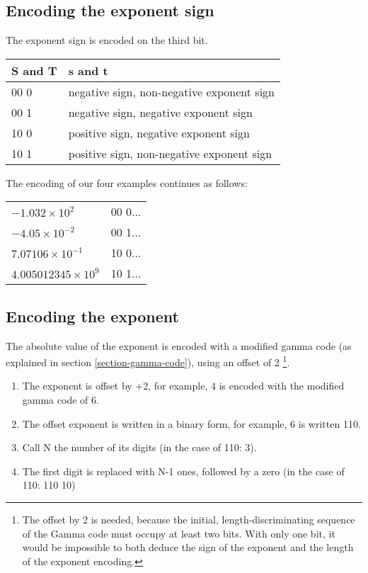 \documentclass[final,leqno,onefignum,onetabnum]{siamltex1213}
\begin{document}
\subsection{Encoding the exponent sign}

The exponent sign is encoded on the third bit.

\begin{tabular}{|l|l|}
\hline
S and T & s and t \\
\hline
00 0 &  negative sign, non-negative exponent sign\\
\hline
00 1 & negative sign, negative exponent sign\\
\hline
10 0 & positive sign, negative exponent sign\\
\hline
10 1 & positive sign, non-negative exponent sign\\
\hline
\end{tabular}


The encoding of our four examples continues as follows:

\begin{tabular}{l|l}
$- 1.032 \times 10^2$ & 00 0... \\

$-4.05 \times 10^{-2}$ & 00 1... \\

$7.07106 \times 10^{-1}$ & 10 0... \\

$4.005012345 \times 10^9$ & 10 1...\\
\end{tabular}

\vspace{10pt}
\subsection{Encoding the exponent}

The absolute value of the exponent is encoded with a modified gamma code (as explained in section \ref{section-gamma-code}), using an offset of 2 \footnote{The offset by 2 is needed, because the initial, length-discriminating sequence of the Gamma code must occupy at least two bits. With only one bit, it would be impossible to both deduce the sign of the exponent and the length of the exponent encoding.}.

\label{section-exponent-encoding}
\begin{enumerate}
\item The exponent is offset by +2, for example, 4 is encoded with the modified gamma code of 6. 
\item  The offset exponent is written in a binary form, for example, 6 is written 110.
\item  Call N the number of its digits (in the case of 110: 3).
\item  The first digit is replaced with N-1 ones, followed by a zero (in the case of 110: 110 10)
\end{enumerate}
\end{document}
